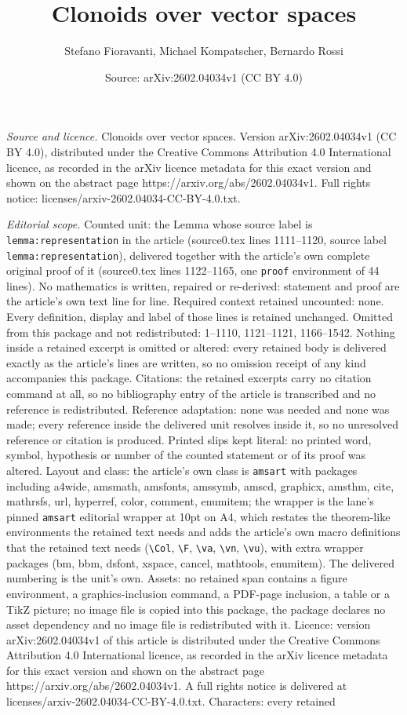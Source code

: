 \documentclass[10pt,a4paper]{amsart}
\title[Clonoids over vector spaces]{Clonoids over vector spaces}
\author{Stefano Fioravanti, Michael Kompatscher, Bernardo Rossi}
\date{Source: arXiv:2602.04034v1 (CC BY 4.0)}
\begin{document}
\maketitle

\noindent\emph{Source and licence.} Clonoids over vector spaces. Version arXiv:2602.04034v1 (CC BY 4.0), distributed under the Creative Commons Attribution 4.0 International licence, as recorded in the arXiv licence metadata for this exact version and shown on the abstract page https://arxiv.org/abs/2602.04034v1. Full rights notice: licenses/arxiv-2602.04034-CC-BY-4.0.txt.\par\smallskip

\noindent\textit{Editorial scope.} Counted unit: the Lemma whose source label is \texttt{lemma:representation} in the article (source0.tex lines 1111--1120, source label \texttt{lemma:representation}), delivered together with the article's own complete original proof of it (source0.tex lines 1122--1165, one \texttt{proof} environment of 44 lines). No mathematics is written, repaired or re-derived: statement and proof are the article's own text line for line. Required context retained uncounted: none. Every definition, display and label of those lines is retained unchanged. Omitted from this package and not redistributed: 1--1110, 1121--1121, 1166--1542. Nothing inside a retained excerpt is omitted or altered: every retained body is delivered exactly as the article's lines are written, so no omission receipt of any kind accompanies this package. Citations: the retained excerpts carry no citation command at all, so no bibliography entry of the article is transcribed and no reference is redistributed. Reference adaptation: none was needed and none was made; every reference inside the delivered unit resolves inside it, so no unresolved reference or citation is produced. Printed slips kept literal: no printed word, symbol, hypothesis or number of the counted statement or of its proof was altered. Layout and class: the article's own class is \texttt{amsart} with packages including a4wide, amsmath, amsfonts, amssymb, amscd, graphicx, amsthm, cite, mathrsfs, url, hyperref, color, comment, enumitem; the wrapper is the lane's pinned \texttt{amsart} editorial wrapper at 10pt on A4, which restates the theorem-like environments the retained text needs and adds the article's own macro definitions that the retained text needs (\texttt{\textbackslash Col}, \texttt{\textbackslash F}, \texttt{\textbackslash va}, \texttt{\textbackslash vn}, \texttt{\textbackslash vu}), with extra wrapper packages (bm, bbm, dsfont, xspace, cancel, mathtools, enumitem). The delivered numbering is the unit's own. Assets: no retained span contains a figure environment, a graphics-inclusion command, a PDF-page inclusion, a table or a TikZ picture; no image file is copied into this package, the package declares no asset dependency and no image file is redistributed with it. Licence: version arXiv:2602.04034v1 of this article is distributed under the Creative Commons Attribution 4.0 International licence, as recorded in the arXiv licence metadata for this exact version and shown on the abstract page https://arxiv.org/abs/2602.04034v1. A full rights notice is delivered at licenses/arxiv-2602.04034-CC-BY-4.0.txt. Characters: every retained 
\end{document}
